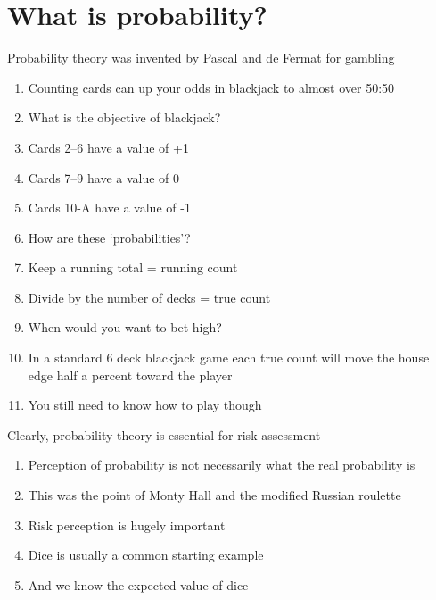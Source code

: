 \documentclass[aspectratio=1610,pdftex,dvipsnames,compress,xcolor={dvipsnames}]{beamer}
\begin{document}
\section{What is probability?}


\addtocounter{framenumber}{-1}
\begin{frame}{Probability theory was invented by Pascal and de Fermat for gambling}
    \begin{enumerate}[series=outerlist,topsep=0pt,itemsep=5pt,leftmargin=*,label=(\arabic*)]
        \item[]Counting cards can up your odds in blackjack to almost over 50:50
        \item[]What is the objective of blackjack?
        \item[]Cards 2--6 have a value of +1
        \item[]Cards 7--9 have a value of 0
        \item[]Cards 10-A have a value of -1
        \item[]How are these `probabilities'?
        \item[]Keep a running total = running count
        \item[]Divide by the number of decks = true count
        \item[]When would you want to bet high?
        \item[]In a standard 6 deck blackjack game each true count will move the house edge half a percent toward the player
        \item[]You still need to know how to play though
    \end{enumerate}
\end{frame}


\begin{frame}{Clearly, probability theory is essential for risk assessment}
    \begin{enumerate}[series=outerlist,topsep=0pt,itemsep=21pt,leftmargin=*,label=(\arabic*)]
        \item[]Perception of probability is not necessarily what the real probability is  
        \item[]This was the point of Monty Hall and the modified Russian roulette
        \item[]Risk perception is hugely important
        \item[]Dice is usually a common starting example
        \item[]And we know the expected value of dice
    \end{enumerate}
\end{frame}
\end{document}
